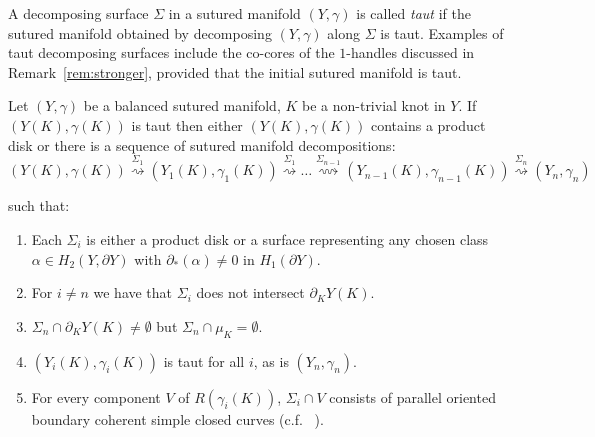 \documentclass{amsart}
\theoremstyle{definition}
\theoremstyle{remark}
\numberwithin{equation}{section}
\begin{document}
A decomposing surface $\Sigma$ in a sutured manifold $(Y,\gamma)$ is called \emph{taut} if the sutured manifold obtained by decomposing $(Y,\gamma)$ along $\Sigma$ is taut. Examples of taut decomposing surfaces include the co-cores of the $1$-handles discussed in Remark~\ref{rem:stronger}, provided that the initial sutured manifold is taut.


\begin{theorem}\label{thm:hierarchy}
 Let $(Y,\gamma)$ be a balanced sutured manifold, $K$ be a non-trivial knot in $Y$. If $(Y(K),\gamma(K))$ is taut then either $(Y(K),\gamma(K))$ contains a product disk or there is a sequence of sutured manifold decompositions:
\begin{equation*}    
   (Y(K),\gamma(K)) \overset{\Sigma_1}\rightsquigarrow (Y_1(K),\gamma_1(K)) \overset{\Sigma_1}\rightsquigarrow\dots\overset{\Sigma_{n-1}}\rightsquigarrow(Y_{n-1}(K),\gamma_{n-1}(K))\overset{\Sigma_{n}}{\rightsquigarrow} (Y_n,\gamma_n)
\end{equation*}

\noindent such that:
\begin{enumerate}
\item Each $\Sigma_i$ is either a product disk or a surface representing any chosen class $\alpha\in H_2(Y,\partial Y)$ with $\partial_*(\alpha)\neq 0$ in $H_1(\partial Y)$.
\item For $i\neq n$ we have that $\Sigma_i$ does not intersect $\partial_KY(K)$.
\item $\Sigma_n\cap\partial_KY(K)\neq\emptyset$ but $\Sigma_n\cap\mu_K=\emptyset$.
\item $(Y_i(K),\gamma_i(K))$ is taut for all $i$, as is $(Y_n,\gamma_n)$.
\item\label{pnt:boundaryproperties} For every component $V$ of $R(\gamma_i(K))$, $\Sigma_i\cap V$ consists of parallel oriented boundary coherent simple closed curves (c.f. ~\cite[Definition 1.2]{juhasz2008floer}).


\end{enumerate}

\end{theorem}
\end{document}
